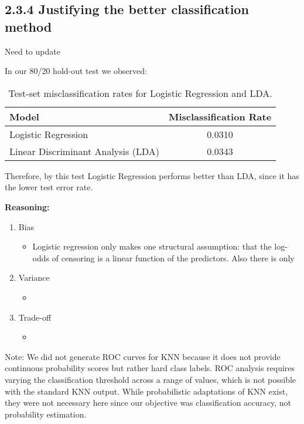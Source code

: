 \documentclass[
]{article}
\begin{document}
\subsection{2.3.4 Justifying the better classification
method}\label{justifying-the-better-classification-method}

Need to update

In our 80/20 hold-out test we observed:

\begin{table}[ht]
\centering
\begin{tabular}{l c}
\hline
\textbf{Model}            & \textbf{Misclassification Rate} \\ 
\hline
Logistic Regression       & 0.0310                          \\
Linear Discriminant Analysis (LDA) & 0.0343                          \\
\hline
\end{tabular}
\caption{Test-set misclassification rates for Logistic Regression and LDA.}
\label{tab:misclass}
\end{table}

Therefore, by this test Logistic Regression performs better than LDA,
since it has the lower test error rate.

\textbf{Reasoning:}

\begin{enumerate}
  \item Bias
  \begin{itemize}
    \item Logistic regression only makes one structural assumption: that the log-odds of censoring is a linear function of the predictors. Also there is only 
  \end{itemize}
  \item Variance
  \begin{itemize}
    \item
  \end{itemize}
  \item Trade-off
  \begin{itemize}
    \item
  \end{itemize}
\end{enumerate}

Note: We did not generate ROC curves for KNN because it does not provide
continuous probability scores but rather hard class labels. ROC analysis
requires varying the classification threshold across a range of values,
which is not possible with the standard KNN output. While probabilistic
adaptations of KNN exist, they were not necessary here since our
objective was classification accuracy, not probability estimation.
\end{document}

